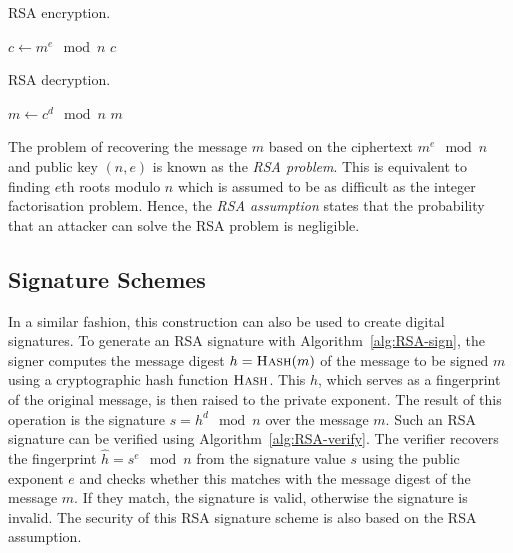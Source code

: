 \begin{algorithm}[ht]
  \caption{RSA encryption.}
  \label{alg:RSA-encrypt}
  \addtolength{\baselineskip}{1mm}
  \begin{algorithmic}[1]
      \State $c \gets m^e \mod n$
      \Return $c$
    \EndFunction
  \end{algorithmic}
\end{algorithm}
\begin{algorithm}[ht]
  \caption{RSA decryption.}
  \label{alg:RSA-decrypt}
  \addtolength{\baselineskip}{1mm}
  \begin{algorithmic}[1]
      \State $m \gets c^d \mod n$
      \Return $m$
    \EndFunction
  \end{algorithmic}
\end{algorithm}

The problem of recovering the message $m$ based on the ciphertext $m^e \mod n$
and public key $(n, e)$ is known as the \emph{RSA problem}.
This is equivalent to finding $e$th roots modulo $n$ which is assumed to be as
difficult as the integer factorisation problem. Hence, the \emph{RSA assumption} states that
the probability that an attacker can solve the RSA problem is negligible.

\subsection{Signature Schemes}

In a similar fashion, this construction can also be used to create digital
signatures. To generate an RSA signature with Algorithm~\ref{alg:RSA-sign}, the
signer computes the message digest $h = \Call{Hash}{m}$ of the message to be
signed $m$ using a cryptographic hash function $\Call{Hash}{}$. This $h$, which
serves as a fingerprint of the original message, is then raised to the private
exponent. The result of this operation is the signature $s = h^d \mod n$ over
the message $m$.
Such an RSA signature can be verified using Algorithm~\ref{alg:RSA-verify}. The
verifier recovers the fingerprint $\hat{h} = s^e \mod n$ from the signature
value $s$ using the public exponent $e$ and checks whether this matches with the
message digest of the message $m$. If they match, the signature is valid,
otherwise the signature is invalid. The security of this RSA signature scheme is
also based on the RSA assumption.

